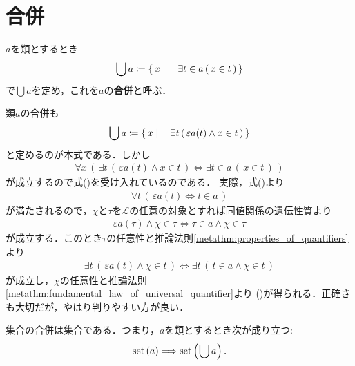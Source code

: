 \section{合併}
	\begin{screen}
		\begin{dfn}[合併]
			$a$を類とするとき
			\begin{align}
				\bigcup a \coloneqq \left\{\, x \mid \quad \exists t \in a\, (\, x \in t\, )\, \right\}
				\label{eq:definition_of_union_1}
			\end{align}
			で$\bigcup a$を定め，これを$a$の{\bf 合併}と呼ぶ．
		\end{dfn}
	\end{screen}
	
	類$a$の合併も
	\begin{align}
		\bigcup a \coloneqq \left\{\, x \mid \quad \exists t\, (\, \varepsilon a(t) \wedge x \in t\, )\, \right\}
	\end{align}
	と定めるのが本式である．しかし
	\begin{align}
		\forall x\, \left(\, \exists t\, (\, \varepsilon a(t) \wedge x \in t\, )
		\Longleftrightarrow \exists t \in a\, (\, x \in t\, )\, \right)
		\label{eq:definition_of_union_2}
	\end{align}
	が成立するので式()を受け入れているのである．
	実際，式()より
	\begin{align}
		\forall t\, \left(\, \varepsilon a(t) \Longleftrightarrow t \in a\, \right)
	\end{align}
	が満たされるので，$\chi$と$\tau$を$\mathcal{L}$の任意の対象とすれば同値関係の遺伝性質より
	\begin{align}
		\varepsilon a(\tau) \wedge \chi \in \tau \Longleftrightarrow \tau \in a \wedge \chi \in \tau
	\end{align}
	が成立する．このとき$\tau$の任意性と推論法則\ref{metathm:properties_of_quantifiers}より
	\begin{align}
		\exists t\, (\, \varepsilon a(t) \wedge \chi \in t\, )
		\Longleftrightarrow \exists t\, (\, t \in a \wedge \chi \in t\, )
	\end{align}
	が成立し，$\chi$の任意性と推論法則\ref{metathm:fundamental_law_of_universal_quantifier}より
	()が得られる．正確さも大切だが，やはり判りやすい方が良い．
	
	\begin{screen}
		\begin{axm}[合併の公理]
			集合の合併は集合である．つまり，$a$を類とするとき次が成り立つ:
			\begin{align}
				\operatorname*{set} \left(a\right) \Longrightarrow \operatorname*{set} \left(\bigcup a\right).
			\end{align}
		\end{axm}
	\end{screen}
	
